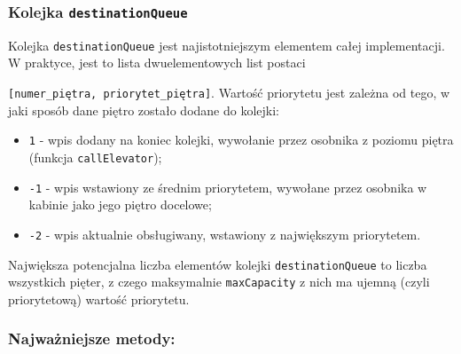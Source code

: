 \documentclass[12pt, a4paper]{article}
\begin{document}
\subsubsection{Kolejka \texttt{destinationQueue}}
\label{subsubsec:elevator_kolejka}

Kolejka \texttt{destinationQueue} jest najistotniejszym elementem całej implementacji. W praktyce, jest to lista dwuelementowych list postaci 

\texttt{[numer\_piętra, priorytet\_piętra]}. Wartość priorytetu jest zależna od tego, w jaki sposób dane piętro zostało dodane do kolejki:
\begin{itemize}
  \item \texttt{1} - wpis dodany na koniec kolejki, wywołanie przez osobnika z poziomu piętra (funkcja \texttt{callElevator});
  \item \texttt{-1} - wpis wstawiony ze średnim priorytetem, wywołane przez osobnika w kabinie jako jego piętro docelowe;
  \item \texttt{-2} - wpis aktualnie obsługiwany, wstawiony z największym priorytetem.
\end{itemize}

Największa potencjalna liczba elementów kolejki \texttt{destinationQueue} to liczba wszystkich pięter, z czego maksymalnie \texttt{maxCapacity} z nich 
ma ujemną (czyli priorytetową) wartość priorytetu. 

\subsubsection{Najważniejsze metody:}
\end{document}
